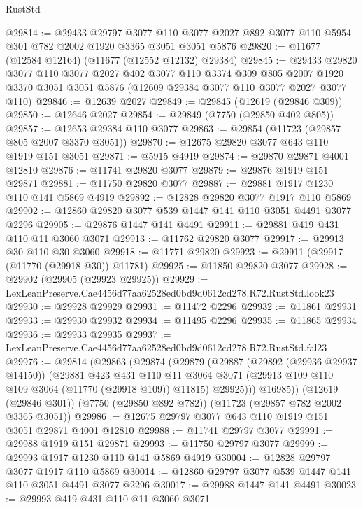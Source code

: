 \begin{lexlean}{RustStd}
\begin{coremodule}
@29814 := @29433
    @29797
    @3077
    @110
    @3077
    @2027
    @892
    @3077
    @110
    @5954
    @301
    @782
    @2002
    @1920
    @3365
    @3051
    @3051
    @5876
@29820 := @11677 (@12584 @12164) (@11677 (@12552 @12132) @29384)
@29845 := @29433
    @29820
    @3077
    @110
    @3077
    @2027
    @402
    @3077
    @110
    @3374
    @309
    @805
    @2007
    @1920
    @3370
    @3051
    @3051
    @5876
    (@12609 @29384 @3077 @110 @3077 @2027 @3077 @110)
@29846 := @12639 @2027
@29849 := @29845 (@12619 (@29846 @309))
@29850 := @12646 @2027
@29854 := @29849 (@7750 (@29850 @402 @805))
@29857 := @12653 @29384 @110 @3077
@29863 := @29854 (@11723 (@29857 @805 @2007 @3370 @3051))
@29870 := @12675 @29820 @3077 @643 @110 @1919 @151 @3051
@29871 := @5915 @4919
@29874 := @29870 @29871 @4001 @12810
@29876 := @11741 @29820 @3077
@29879 := @29876 @1919 @151 @29871
@29881 := @11750 @29820 @3077
@29887 := @29881 @1917 @1230 @110 @141 @5869 @4919
@29892 := @12828 @29820 @3077 @1917 @110 @5869
@29902 := @12860 @29820 @3077 @539 @1447 @141 @110 @3051 @4491 @3077 @2296
@29905 := @29876 @1447 @141 @4491
@29911 := @29881 @419 @431 @110 @11 @3060 @3071
@29913 := @11762 @29820 @3077
@29917 := @29913 @30 @110 @30 @3060
@29918 := @11771 @29820
@29923 := @29911 (@29917 (@11770 (@29918 @30)) @11781)
@29925 := @11850 @29820 @3077
@29928 := @29902 (@29905 (@29923 @29925))
@29929 := LexLeanPreserve.Cae4456d77aa62528ed0bd9d0612cd278.R72.RustStd.look23
@29930 := @29928 @29929
@29931 := @11472 @2296
@29932 := @11861 @29931
@29933 := @29930 @29932
@29934 := @11495 @2296
@29935 := @11865 @29934
@29936 := @29933 @29935
@29937 := LexLeanPreserve.Cae4456d77aa62528ed0bd9d0612cd278.R72.RustStd.fal23
@29976 := @29814
    (@29863
      (@29874
        (@29879
          (@29887
            (@29892 (@29936 @29937 @14150))
            (@29881
              @423
              @431
              @110
              @11
              @3064
              @3071
              (@29913 @109 @110 @109 @3064 (@11770 (@29918 @109)) @11815)
              @29925)))
        @16985))
    (@12619 (@29846 @301))
    (@7750 (@29850 @892 @782))
    (@11723 (@29857 @782 @2002 @3365 @3051))
@29986 := @12675 @29797 @3077 @643 @110 @1919 @151 @3051 @29871 @4001 @12810
@29988 := @11741 @29797 @3077
@29991 := @29988 @1919 @151 @29871
@29993 := @11750 @29797 @3077
@29999 := @29993 @1917 @1230 @110 @141 @5869 @4919
@30004 := @12828 @29797 @3077 @1917 @110 @5869
@30014 := @12860 @29797 @3077 @539 @1447 @141 @110 @3051 @4491 @3077 @2296
@30017 := @29988 @1447 @141 @4491
@30023 := @29993 @419 @431 @110 @11 @3060 @3071

\end{coremodule}
\end{lexlean}
